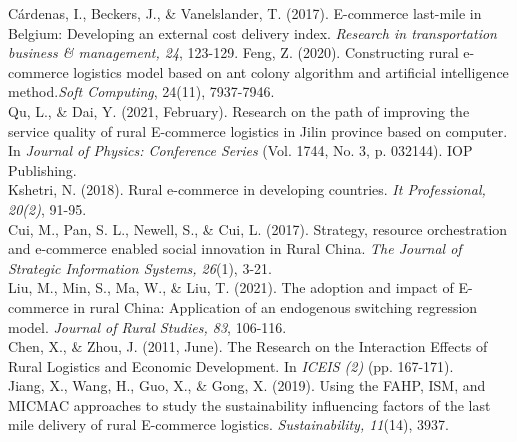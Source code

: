 \documentclass{article}
\begin{document}
Cárdenas, I., Beckers, J., \& Vanelslander, T. (2017). E-commerce last-mile in Belgium: Developing an external cost delivery index. {\it Research in transportation business \& management, 24}, 123-129.
Feng, Z. (2020). Constructing rural e-commerce logistics model based on ant colony algorithm and artificial intelligence method.{\it Soft Computing}, 24(11), 7937-7946.\\
Qu, L., \& Dai, Y. (2021, February). Research on the path of improving the service quality of rural E-commerce logistics in Jilin province based on computer. In {\it Journal of Physics: Conference Series} (Vol. 1744, No. 3, p. 032144). IOP Publishing.\\
Kshetri, N. (2018). Rural e-commerce in developing countries. {\it It Professional, 20(2)}, 91-95.\\
Cui, M., Pan, S. L., Newell, S., \& Cui, L. (2017). Strategy, resource orchestration and e-commerce enabled social innovation in Rural China. {\it The Journal of Strategic Information Systems, 26}(1), 3-21.\\
Liu, M., Min, S., Ma, W., \& Liu, T. (2021). The adoption and impact of E-commerce in rural China: Application of an endogenous switching regression model. {\it Journal of Rural Studies, 83}, 106-116.\\
Chen, X., \& Zhou, J. (2011, June). The Research on the Interaction Effects of Rural Logistics and Economic Development. In {\it ICEIS (2)} (pp. 167-171).\\
Jiang, X., Wang, H., Guo, X., \& Gong, X. (2019). Using the FAHP, ISM, and MICMAC approaches to study the sustainability influencing factors of the last mile delivery of rural E-commerce logistics. {\it Sustainability, 11}(14), 3937.\\


  
\end{document}
